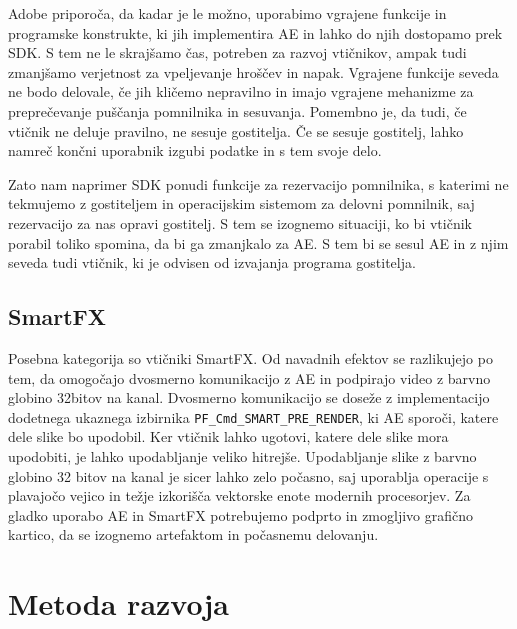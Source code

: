 \documentclass[a4paper, 12pt]{book}
\begin{document}

Adobe priporoča, da kadar je le možno, uporabimo vgrajene funkcije in programske konstrukte, ki jih implementira AE in lahko do njih dostopamo prek SDK. 
S tem ne le skrajšamo čas, potreben za razvoj vtičnikov, ampak tudi zmanjšamo verjetnost za vpeljevanje hroščev in napak. 
Vgrajene funkcije seveda ne bodo delovale, če jih kličemo nepravilno in imajo vgrajene mehanizme za preprečevanje puščanja pomnilnika in sesuvanja. 
Pomembno je, da tudi, če vtičnik ne deluje pravilno, ne sesuje gostitelja. 
Če se sesuje gostitelj, lahko namreč končni uporabnik izgubi podatke in s tem svoje delo. 

Zato nam naprimer SDK ponudi funkcije za rezervacijo pomnilnika, s katerimi ne tekmujemo z gostiteljem in operacijskim sistemom za delovni pomnilnik, saj rezervacijo za nas opravi gostitelj.
S tem se izognemo situaciji, ko bi vtičnik porabil toliko spomina, da bi ga zmanjkalo za AE. 
S tem bi se sesul AE in z njim seveda tudi vtičnik, ki je odvisen od izvajanja programa gostitelja.


\subsection{SmartFX} %

Posebna kategorija so vtičniki SmartFX. 
Od navadnih efektov se razlikujejo po tem, da omogočajo dvosmerno komunikacijo z AE in podpirajo video z barvno globino 32bitov na kanal\cite{aesdk}. 
Dvosmerno komunikacijo se doseže z  implementacijo dodetnega ukaznega izbirnika {\tt PF\_Cmd\_SMART\_PRE\_RENDER}, ki AE sporoči, katere dele slike bo upodobil. 
Ker vtičnik lahko ugotovi, katere dele slike mora upodobiti, je lahko upodabljanje veliko hitrejše.
Upodabljanje slike z barvno globino 32 bitov na kanal je sicer lahko zelo počasno, saj uporablja operacije s plavajočo vejico in težje izkorišča vektorske enote modernih procesorjev.
Za gladko uporabo AE in SmartFX potrebujemo podprto in zmogljivo grafično kartico, da se izognemo artefaktom in počasnemu delovanju\cite{preproccclassroom}.


\section{Metoda razvoja}
\end{document}
